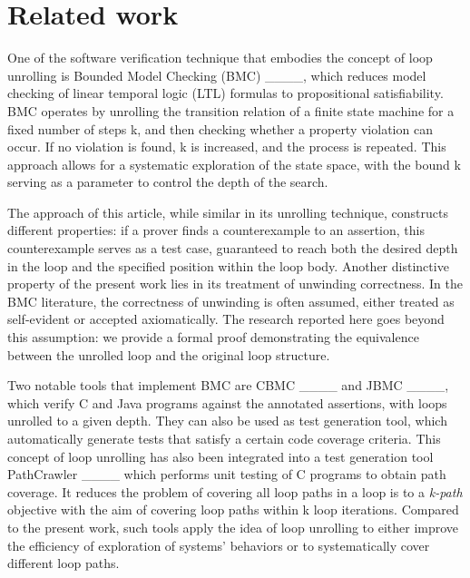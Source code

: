\section{Related work}
\label{related}
\label{related_work}
One of the software verification technique that embodies the concept of loop unrolling is
Bounded Model Checking (BMC) ____,  which reduces model checking of linear temporal logic (LTL) formulas to propositional satisfiability.  
BMC operates by unrolling the transition relation of a finite state machine for a fixed number of steps k, and then checking whether a property violation can occur. If no violation is found, k is increased, and the process is repeated. This approach allows for a systematic exploration of the state space, with the bound k serving as a parameter to control the depth of the search.

The approach of this article, while similar in its unrolling technique, constructs different properties: if a prover finds a counterexample to an assertion, this counterexample serves as a test case, guaranteed to reach both the desired depth in the loop and the specified position within the loop body.
Another distinctive property of the present work lies in its treatment of unwinding correctness. In the BMC literature, the correctness of unwinding is often assumed, either treated as self-evident or accepted axiomatically. The research reported here goes beyond this assumption: we provide a formal proof demonstrating the equivalence between the unrolled loop and the original loop structure.

Two notable tools that implement BMC are CBMC ____ and JBMC ____, which verify C and Java programs against the annotated  assertions, with loops unrolled to a given depth. They can also be used as test generation tool, which automatically generate tests that satisfy a certain code coverage criteria.
This concept of loop unrolling has also been integrated into a test generation tool PathCrawler ____ which performs unit testing of C programs to obtain path coverage. It reduces the problem of covering all loop paths in a loop is to a \emph{k-path} objective with the aim of covering loop paths within k loop iterations. Compared to the present work, such tools apply the idea of loop unrolling to either improve the efficiency of exploration of systems' behaviors or to systematically cover different loop paths.


